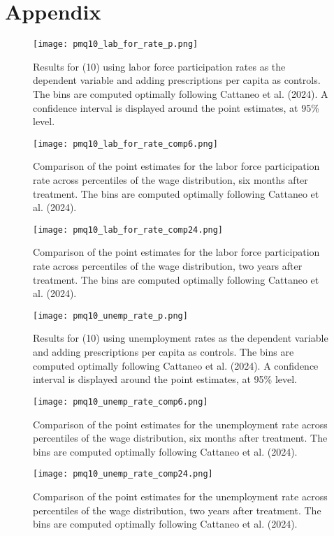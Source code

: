 \documentclass[12pt,a4paper]{article}
\begin{document}
\newpage

\section*{Appendix}

\begin{figure}[htbp]
    \centering
    \texttt{[image: pmq10\_lab\_for\_rate\_p.png]}
    \caption{Results for (10) using labor force participation rates as the dependent variable and adding prescriptions per capita as controls. The bins are computed optimally following Cattaneo et al. (2024). A confidence interval is displayed around the point estimates, at 95\% level.}
    \label{fig:lab_for_rate_p}
\end{figure}

\begin{figure}[htbp]
    \centering
    \texttt{[image: pmq10\_lab\_for\_rate\_comp6.png]}
    \caption{Comparison of the point estimates for the labor force participation rate across percentiles of the wage distribution, six months after treatment. The bins are computed optimally following Cattaneo et al. (2024).}
    \label{fig:lab_for_rate_comp6}
\end{figure}

\begin{figure}[htbp]
    \centering
    \texttt{[image: pmq10\_lab\_for\_rate\_comp24.png]}
    \caption{Comparison of the point estimates for the labor force participation rate across percentiles of the wage distribution, two years after treatment. The bins are computed optimally following Cattaneo et al. (2024).}
    \label{fig:lab_for_rate_comp24}
\end{figure}

\begin{figure}[htbp]
    \centering
    \texttt{[image: pmq10\_unemp\_rate\_p.png]}
    \caption{Results for (10) using unemployment rates as the dependent variable and adding prescriptions per capita as controls. The bins are computed optimally following Cattaneo et al. (2024). A confidence interval is displayed around the point estimates, at 95\% level.}
    \label{fig:unemp_rate_p}
\end{figure}

\begin{figure}[htbp]
    \centering
    \texttt{[image: pmq10\_unemp\_rate\_comp6.png]}
    \caption{Comparison of the point estimates for the unemployment rate across percentiles of the wage distribution, six months after treatment. The bins are computed optimally following Cattaneo et al. (2024).}
    \label{fig:unemp_rate_comp6}
\end{figure}

\begin{figure}[htbp]
    \centering
    \texttt{[image: pmq10\_unemp\_rate\_comp24.png]}
    \caption{Comparison of the point estimates for the unemployment rate across percentiles of the wage distribution, two years after treatment. The bins are computed optimally following Cattaneo et al. (2024).}
    \label{fig:unemp_rate_comp24}
\end{figure}
\end{document}
